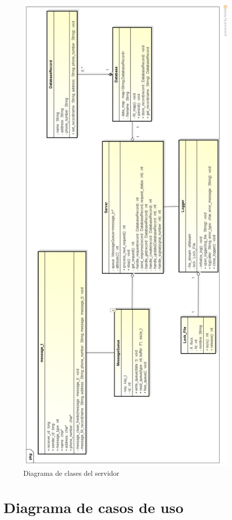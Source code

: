 \documentclass[11pt,spanish,a4paper,openany,notitlepage]{article}
\begin{document}
\begin{figure}[H]
\begin{center}
\includegraphics[width=310pt]{clases_servidor.png}
\caption{Diagrama de clases del servidor}
\end{center}
\end{figure}

\newpage

\section{Diagrama de casos de uso}
\end{document}
